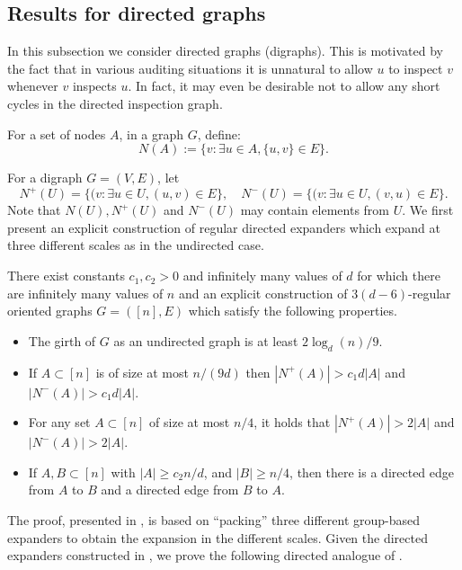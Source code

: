\documentclass{toc}
\begin{document}
\subsection{Results for directed graphs}
In this subsection we consider directed graphs (digraphs). 
This is motivated by the fact
that in various auditing situations it is 
unnatural to allow $u$ to inspect $v$ whenever 
$v$ inspects $u$. In fact, it may even be desirable not to allow any short cycles in the directed inspection graph. 

%

%

%
For a set of nodes $A$, in a graph $G$, define:
\begin{equation} \label{def:na}
N(A) := \{ v : \exists u \in A, \{u,v\} \in E \}.
\end{equation}

For a digraph $G=(V,E)$, let 
\[
N^{+}(U) = \{ (v : \exists u \in U, (u,v) \in E\}, \quad 
N^{-}(U) = \{ (v : \exists u \in U, (v,u) \in E\}.
\]
Note that $N(U), N^{+}(U)$ and $N^{-}(U)$ may contain elements from $U$. 
We first present an explicit construction of regular directed 
expanders which expand at three 
different scales as in the undirected case. 

%
\begin{proposition}
\label{p14} 
There
%
exist constants $c_1,c_2 > 0$ 
and  infinitely many values of 
$d$ for which there are infinitely many values of $n$ and an 
explicit construction of $3(d-6)$-regular oriented
%
graphs $G=([n],E)$ which satisfy
%
the following properties.
%
\begin{itemize}
\item The girth of $G$ as an undirected graph is at least $2 \log_{d}(n) / 9$. 
\item If $A \subset [n]$ is of size at most $n/(9 d)$ then $|N^{+}(A)| > c_1 d |A|$ and $|N^{-}(A)| > c_1 d |A|$. 
\item For any set $A \subset [n]$ of size at most $n/4$, it holds that $|N^{+}(A)| > 2 |A|$ and $|N^{-}(A)| > 2|A|$. 
\item If $A,B \subset [n]$ with $|A| \geq c_2 n /d$, and
  $|B| \geq n/4$, then there is a directed edge from $A$ to $B$ and a
  directed edge from $B$ to $A$.
\end{itemize} 
\end{proposition} 

%

The proof, presented in , is based 
on ``packing'' three different group-based expanders 
to obtain the expansion in the different scales.  Given 
the directed expanders constructed in , we prove the following directed analogue of .
\end{document}
